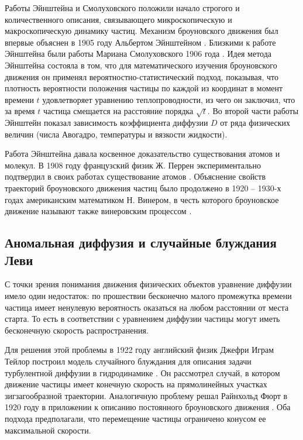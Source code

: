 Работы Эйнштейна и Смолуховского положили начало строгого и количественного описания, связывающего микроскопическую и макроскопическую динамику частиц. Механизм броуновского движения был впервые объяснен в 1905 году Альбертом Эйнштейном \cite{einstein_uber_1905}. Близкими к работе Эйнштейна были работы Мариана Смолуховского 1906 года \cite{vonsmoluchowski_zur_1906}. Идея метода Эйнштейна состояла в том, что для математического изучения броуновского движения он применял вероятностно-статистический подход, показывая, что плотность вероятности положения частицы по каждой из координат в момент времени $t$ удовлетворяет уравнению теплопроводности, из чего он заключил, что за время $t$ частица смещается на расстояние порядка $\sqrt{t}$. Во второй части работы Эйнштейн показал зависимость коэффициента диффузии $D$ от ряда физических величин (числа Авогадро, температуры и вязкости жидкости).

Работа Эйнштейна давала косвенное доказательство существования атомов и молекул. В 1908 году французский физик Ж. Перрен экспериментально подтвердил в своих работах существование атомов \cite{perrin_atomes_1921}. Объяснение свойств траекторий броуновского движения частиц было продолжено в 1920 – 1930-х годах американским математиком Н. Винером, в честь которого броуновское движение называют также винеровским процессом \cite{wiener_average_1921a}.

\subsection{Аномальная диффузия и случайные блуждания Леви}\label{subsec:ch1/sec2/sub2}

С точки зрения понимания движения физических объектов уравнение диффузии имело один недостаток: по прошествии бесконечно малого промежутка времени частица имеет ненулевую вероятность оказаться на любом расстоянии от места старта. То есть в соответствии с уравнением диффузии частицы могут иметь бесконечную скорость распространения.

Для решения этой проблемы в 1922 году английский физик Джефри Играм Тейлор построил модель случайного блуждания для описания задачи турбулентной диффузии в гидродинамике \cite{taylor_diffusion_1922}. Он рассмотрел случай, в котором движение частицы имеет конечную скорость на прямолинейных участках зигзагообразной траектории. Аналогичную проблему решал Райнхольд Фюрт в 1920 году в приложении к описанию постоянного броуновского движения \cite{furth_zur_1920}. Оба подхода предполагали, что перемещение частицы ограничено конусом ее максимальной скорости.

